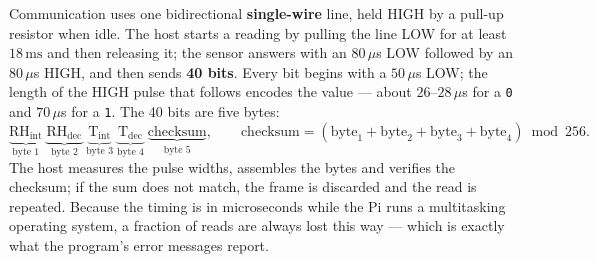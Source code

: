 \documentclass[10pt,a4paper]{article}
\begin{document}
Communication uses one bidirectional \textbf{single-wire} line, held HIGH by a
pull-up resistor when idle. The host starts a reading by pulling the line LOW for at
least $18\,\mathrm{ms}$ and then releasing it; the sensor answers with an $80\,\mu$s LOW
followed by an $80\,\mu$s HIGH, and then sends \textbf{40 bits}. Every bit begins with
a $50\,\mu$s LOW; the length of the HIGH pulse that follows encodes the value --- about
$26$--$28\,\mu$s for a \texttt{0} and $70\,\mu$s for a \texttt{1}. The 40 bits are five
bytes:
\[
  \underbrace{\mathrm{RH_{int}}}_{\text{byte 1}}\;
  \underbrace{\mathrm{RH_{dec}}}_{\text{byte 2}}\;
  \underbrace{\mathrm{T_{int}}}_{\text{byte 3}}\;
  \underbrace{\mathrm{T_{dec}}}_{\text{byte 4}}\;
  \underbrace{\mathrm{checksum}}_{\text{byte 5}},
  \qquad
  \mathrm{checksum} = (\mathrm{byte}_1+\mathrm{byte}_2+\mathrm{byte}_3+\mathrm{byte}_4) \bmod 256 .
\]
The host measures the pulse widths, assembles the bytes and verifies the checksum; if
the sum does not match, the frame is discarded and the read is repeated. Because the
timing is in microseconds while the Pi runs a multitasking operating system, a
fraction of reads are always lost this way --- which is exactly what the program's
error messages report.
\end{document}

